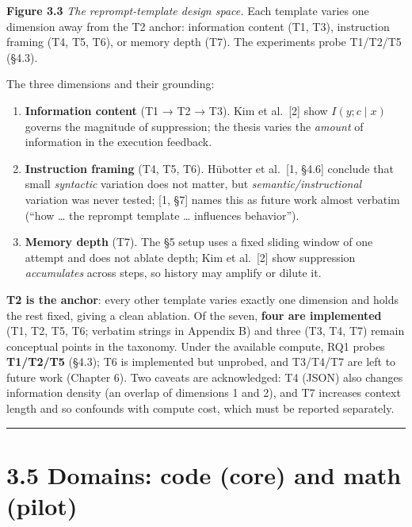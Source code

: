 \textbf{Figure 3.3}
\emph{The reprompt-template design space.} Each template varies one dimension away from the T2 anchor: information content (T1, T3), instruction framing (T4, T5, T6), or memory depth (T7). The experiments probe T1/T2/T5 (§4.3).

The three dimensions and their grounding:

\begin{enumerate}
\def\labelenumi{\arabic{enumi}.}
\tightlist
\item
  \textbf{Information content} (T1 → T2 → T3). Kim et al.~{[}2{]} show \(I(y; c \mid x)\) governs the magnitude of suppression; the thesis varies the \emph{amount} of information in the execution feedback.
\item
  \textbf{Instruction framing} (T4, T5, T6). Hübotter et al.~{[}1, §4.6{]} conclude that small \emph{syntactic} variation does not matter, but \emph{semantic/instructional} variation was never tested; {[}1, §7{]} names this as future work almost verbatim (``how \ldots{} the reprompt template \ldots{} influences behavior'').
\item
  \textbf{Memory depth} (T7). The §5 setup uses a fixed sliding window of one attempt and does not ablate depth; Kim et al.~{[}2{]} show suppression \emph{accumulates} across steps, so history may amplify or dilute it.
\end{enumerate}

\textbf{T2 is the anchor}: every other template varies exactly one dimension and holds the rest fixed, giving a clean ablation. Of the seven, \textbf{four are implemented} (T1, T2, T5, T6; verbatim strings in Appendix B) and three (T3, T4, T7) remain conceptual points in the taxonomy. Under the available compute, RQ1 probes \textbf{T1/T2/T5} (§4.3); T6 is implemented but unprobed, and T3/T4/T7 are left to future work (Chapter 6). Two caveats are acknowledged: T4 (JSON) also changes information density (an overlap of dimensions 1 and 2), and T7 increases context length and so confounds with compute cost, which must be reported separately.

\begin{center}\rule{0.5\linewidth}{0.5pt}\end{center}

\section{3.5 Domains: code (core) and math (pilot)}\label{domains-code-core-and-math-pilot}

